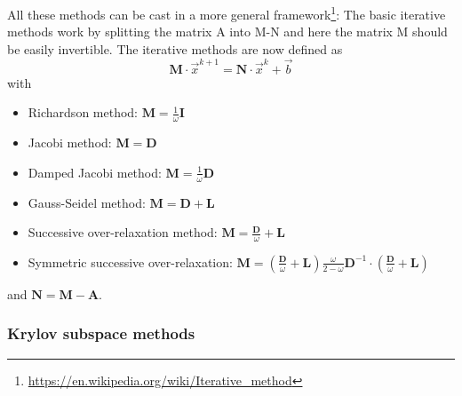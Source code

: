 

All these methods can be cast in a more general framework\footnote{
\url{https://en.wikipedia.org/wiki/Iterative_method}}: 
The basic iterative methods work by splitting the matrix A into M-N 
and here the matrix M should be easily invertible. The iterative methods are now defined as 
\begin{equation}
{\bm M} \cdot \vec{x}^{k+1} = {\bm N}\cdot \vec{x}^k + \vec{b}
\end{equation}
with 
\begin{itemize}
\item Richardson method: ${\bm M}=\frac{1}{\omega} {\bm I}$
\item Jacobi method: ${\bm M}={\bm D}$
\item Damped Jacobi method: ${\bm M}=\frac{1}{\omega}{\bm D}$
\item Gauss-Seidel method: ${\bm M}={\bm D} + {\bm L}$
\item Successive over-relaxation method: ${\bm M} = \frac{\bm D}{\omega}+{\bm L}$
\item Symmetric successive over-relaxation:  ${\bm M} = \left(\frac{\bm D}{\omega}+{\bm L}\right) \frac{\omega}{2-\omega} {\bm D}^{-1}\cdot \left(\frac{\bm D}{\omega}+ {\bm L} \right)$
\end{itemize}
and ${\bm N}={\bm M}-{\bm A}$.

\subsubsection{Krylov subspace methods}

